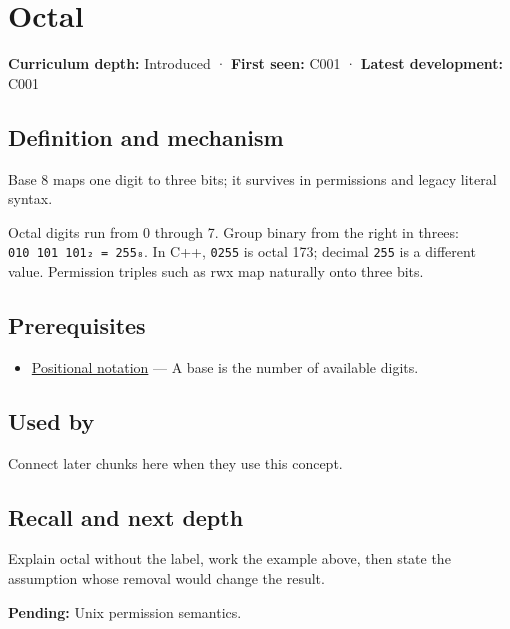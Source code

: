 \hypertarget{appendix-17fc1bc8b305}{}\label{referencestart:appendix-17fc1bc8b305}
\section{Octal}\label{appendix-17fc1bc8b305-octal}

\textbf{Curriculum depth:} Introduced · \textbf{First seen:} C001 · \textbf{Latest development:} C001

\subsection{Definition and mechanism}\label{appendix-17fc1bc8b305-definition-and-mechanism}

Base 8 maps one digit to three bits; it survives in permissions and legacy literal syntax.

Octal digits run from 0 through 7. Group binary from the right in threes: \texttt{010\ 101\ 101₂\ =\ 255₈}. In C++, \texttt{0255} is octal 173; decimal \texttt{255} is a different value. Permission triples such as rwx map naturally onto three bits.

\subsection{Prerequisites}\label{appendix-17fc1bc8b305-prerequisites}

\begin{itemize}
\tightlist
\item
  \hyperref[appendix-83c3f28f7bda]{Positional notation} --- A base is the number of available digits.
\end{itemize}

\subsection{Used by}\label{appendix-17fc1bc8b305-used-by}

Connect later chunks here when they use this concept.

\subsection{Recall and next depth}\label{appendix-17fc1bc8b305-recall-and-next-depth}

Explain octal without the label, work the example above, then state the assumption whose removal would change the result.

\textbf{Pending:} Unix permission semantics.

